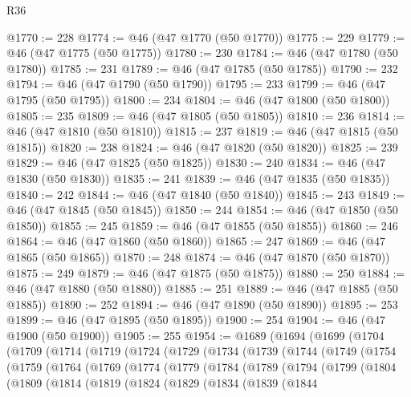 \begin{lexlean}{R36}
\begin{coremodule}
@1770 := 228
@1774 := @46 (@47 @1770 (@50 @1770))
@1775 := 229
@1779 := @46 (@47 @1775 (@50 @1775))
@1780 := 230
@1784 := @46 (@47 @1780 (@50 @1780))
@1785 := 231
@1789 := @46 (@47 @1785 (@50 @1785))
@1790 := 232
@1794 := @46 (@47 @1790 (@50 @1790))
@1795 := 233
@1799 := @46 (@47 @1795 (@50 @1795))
@1800 := 234
@1804 := @46 (@47 @1800 (@50 @1800))
@1805 := 235
@1809 := @46 (@47 @1805 (@50 @1805))
@1810 := 236
@1814 := @46 (@47 @1810 (@50 @1810))
@1815 := 237
@1819 := @46 (@47 @1815 (@50 @1815))
@1820 := 238
@1824 := @46 (@47 @1820 (@50 @1820))
@1825 := 239
@1829 := @46 (@47 @1825 (@50 @1825))
@1830 := 240
@1834 := @46 (@47 @1830 (@50 @1830))
@1835 := 241
@1839 := @46 (@47 @1835 (@50 @1835))
@1840 := 242
@1844 := @46 (@47 @1840 (@50 @1840))
@1845 := 243
@1849 := @46 (@47 @1845 (@50 @1845))
@1850 := 244
@1854 := @46 (@47 @1850 (@50 @1850))
@1855 := 245
@1859 := @46 (@47 @1855 (@50 @1855))
@1860 := 246
@1864 := @46 (@47 @1860 (@50 @1860))
@1865 := 247
@1869 := @46 (@47 @1865 (@50 @1865))
@1870 := 248
@1874 := @46 (@47 @1870 (@50 @1870))
@1875 := 249
@1879 := @46 (@47 @1875 (@50 @1875))
@1880 := 250
@1884 := @46 (@47 @1880 (@50 @1880))
@1885 := 251
@1889 := @46 (@47 @1885 (@50 @1885))
@1890 := 252
@1894 := @46 (@47 @1890 (@50 @1890))
@1895 := 253
@1899 := @46 (@47 @1895 (@50 @1895))
@1900 := 254
@1904 := @46 (@47 @1900 (@50 @1900))
@1905 := 255
@1954 := @1689
    (@1694
      (@1699
        (@1704
          (@1709
            (@1714
              (@1719
                (@1724
                  (@1729
                    (@1734
                      (@1739
                        (@1744
                          (@1749
                            (@1754
                              (@1759
                                (@1764
                                  (@1769
                                    (@1774
                                      (@1779
                                        (@1784
                                          (@1789
                                            (@1794
                                              (@1799
                                                (@1804
                                                  (@1809
                                                    (@1814
                                                      (@1819
                                                        (@1824
                                                          (@1829
                                                            (@1834
                                                              (@1839
                                                                (@1844

\end{coremodule}
\end{lexlean}
